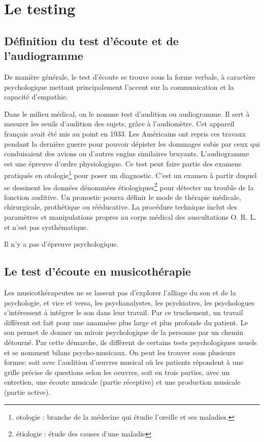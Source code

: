 \chapter{Le testing}

\section{Définition du test d'écoute et de l'audiogramme}

De manière générale, le test d'écoute se trouve sous la forme verbale,
à caractère  
psychologique mettant principalement l'accent sur la communication
et la capacité d'empathie.

Dans le milieu médical, on le nomme test d'audition ou audiogramme. Il
sert à mesurer les seuils d'audition des sujets, grâce à l'audiomètre. Cet 
appareil français avait été mis au point en 1933. Les Américains
ont repris ces travaux pendant la dernière guerre pour pouvoir dépister
les dommages subis par ceux qui conduisaient des avions ou d'autres
engins similaires bruyants.
  L'audiogramme est une épreuve d'ordre physiologique. Ce test peut faire partie des examens  pratiqués en otologie\footnote{otologie : branche de la médecine
  	qui étudie l'oreille et ses maladies.} pour poser un diagnostic. 
   C'est un examen à partir duquel se
  dessinent les données dénommées étiologiques\footnote{étiologie : étude des causes
  	d'une maladie} pour détecter un trouble de la fonction auditive. Un pronostic pourra définir le mode de thérapie
médicale, chirurgicale, prothétique ou rééducative. La procédure
technique inclut des paramètres et manipulations propres au corps
médical des auscultations O. R. L. et  n'est pas systhématique.

Il n'y a pas d'épreuve psychologique. 




\section{Le test d'écoute en musicothérapie}

Les musicothérapeutes ne se lassent pas d'explorer l'alliage du son
 et de la psychologie, et vice
 et versa, les psychanalystes, les psychiatres, les psychologues
 s'intéressent à intégrer le son dans leur travail. Par ce truchement,
 un travail différent est fait pour une anamnèse plus large et
 plus profonde du patient. Le son permet de donner un miroir
 psychologique de la personne par un chemin détourné. Par cette
 démarche, ils diffèrent de certains tests psychologiques usuels
 et se nomment bilans psycho-musicaux. On peut les trouver sous
 plusieurs formes: soit avec l'audition d'\oe uvres
 musical où les patients répondent à une grille précise de questions
 selon les oeuvres, soit en trois parties, avec un entretien,
 une écoute musicale (partie réceptive) et une production musicale
 (partie active).


